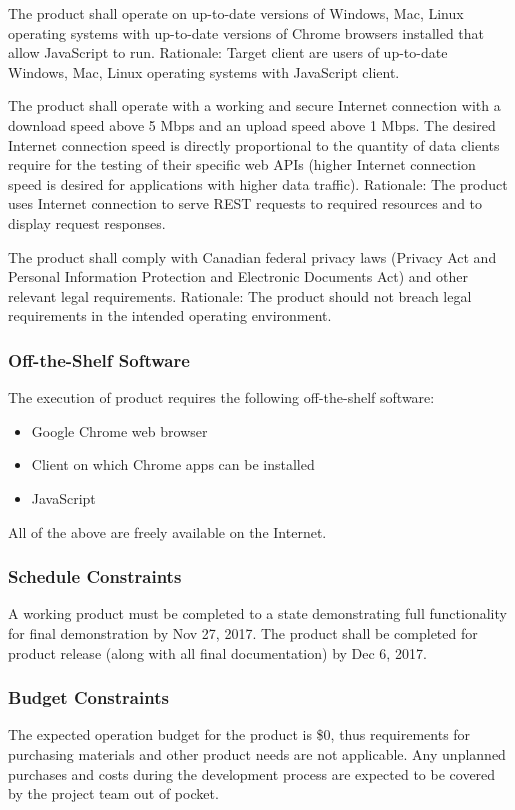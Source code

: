 \documentclass[12pt, titlepage]{article}
\begin{document}
The product shall operate on up-to-date versions of Windows, Mac, Linux operating systems with up-to-date versions of Chrome browsers installed that allow JavaScript to run. Rationale: Target client are users of up-to-date Windows, Mac, Linux operating systems with JavaScript client. 


The product shall operate with a working and secure Internet connection with a download speed above 5 Mbps and an upload speed above 1 Mbps. The desired Internet connection speed is directly proportional to the quantity of data clients require for the testing of their specific web APIs (higher Internet connection speed is desired for applications with higher data traffic).
Rationale: The product uses Internet connection to serve REST requests to required resources and to display request responses.

The product shall comply with Canadian federal privacy laws (Privacy Act and Personal Information Protection and Electronic Documents Act) and other relevant legal requirements. Rationale: The product should not breach legal requirements in the intended operating environment.


\subsubsection{Off-the-Shelf Software}
The execution of product requires the following off-the-shelf software:
\begin{itemize}
	\item Google Chrome web browser
	\item Client on which Chrome apps can be installed  
	\item JavaScript
\end{itemize}
All of the above are freely available on the Internet.

\subsubsection{Schedule Constraints}
A working product must be completed to a state demonstrating full functionality for final demonstration by Nov 27, 2017. The product shall be completed for product release (along with all final documentation) by Dec 6, 2017.

\subsubsection{Budget Constraints}
The expected operation budget for the product is \$0, thus requirements for purchasing materials and other product needs are not applicable. Any unplanned purchases and costs during the development process are expected to be covered by the project team out of pocket.
\end{document}
